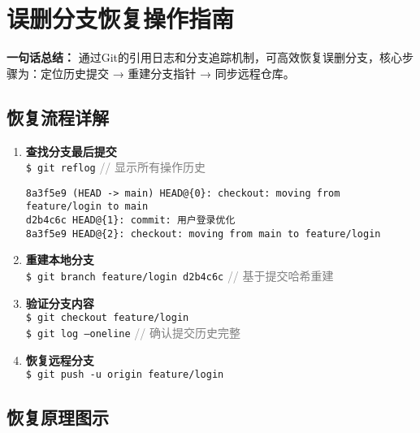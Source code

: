 \section{误删分支恢复操作指南}
\textbf{一句话总结：}  
通过Git的引用日志和分支追踪机制，可高效恢复误删分支，核心步骤为：定位历史提交 → 重建分支指针 → 同步远程仓库。

\subsection{恢复流程详解}
\begin{enumerate}[leftmargin=*, nosep]
    \item \textbf{查找分支最后提交} \\
    \texttt{\$ git reflog} \quad \textcolor{gray}{// 显示所有操作历史}
    \begin{verbatim}
8a3f5e9 (HEAD -> main) HEAD@{0}: checkout: moving from feature/login to main
d2b4c6c HEAD@{1}: commit: 用户登录优化
8a3f5e9 HEAD@{2}: checkout: moving from main to feature/login
    \end{verbatim}
    
    \item \textbf{重建本地分支} \\
    \texttt{\$ git branch feature/login d2b4c6c} \quad \textcolor{gray}{// 基于提交哈希重建}
    
    \item \textbf{验证分支内容} \\
    \texttt{\$ git checkout feature/login} \\
    \texttt{\$ git log --oneline} \quad \textcolor{gray}{// 确认提交历史完整}
    
    \item \textbf{恢复远程分支} \\
    \texttt{\$ git push -u origin feature/login}
\end{enumerate}

\subsection{恢复原理图示}
\begin{center}
\end{center}

